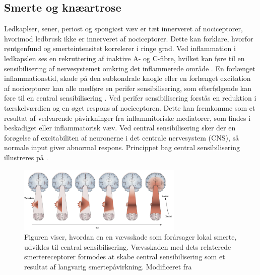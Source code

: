 \subsection{Smerte og knæartrose}
Ledkaplser, sener, periost og spongiøst væv er tæt innerveret af nociceptorer, hvorimod ledbrusk ikke er innerveret af nociceptorer. Dette kan forklare, hvorfor røntgenfund og smerteintensitet korrelerer i ringe grad. \citep{smerter} \citep{Petersen2016} Ved inflammation i ledkapslen ses en rekruttering af inaktive A- og C-fibre, hvilket kan føre til en sensibilisering af nervesystemet omkring det inflammerede område \citep{smerter}. En forlænget inflammationstid, skade på den subkondrale knogle eller en forlænget excitation af nociceptorer kan alle medføre en perifer sensibilisering, som efterfølgende kan føre til en central sensibilisering \citep{Petersen2016}. Ved perifer sensibilisering forstås en reduktion i tærskelværdien og en øget respons af nociceptoren. Dette kan fremkomme som et resultat af vedvarende påvirkninger fra inflammitoriske mediatorer, som findes i beskadiget eller inflammatorisk væv. Ved central sensibilisering sker der en forøgelse af excitabiliten af neuronerne i det centrale nervesystem (CNS), så normale input giver abnormal respons. \citep{nature} Princippet bag central sensibilisering illustreres på .

\begin{figure}[H] 
	\begin{center}
		\includegraphics[width=0.7\textwidth]{figures/dHTAanalyse/widespread_sens}
	\end{center}
	\caption{Figuren viser, hvordan en en vævsskade som forårsager lokal smerte, udvikles til central sensibilisering. Vævsskaden med dets relaterede smertereceptorer formodes at skabe central sensibilisering som et resultat af langvarig smertepåvirkning. Modificeret fra } 
	\label{fig:widespread_sens} 
\end{figure} \vspace{-.25cm}

